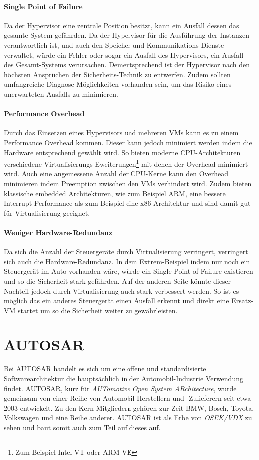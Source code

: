 \documentclass[
  a4paper,					    %
  twoside,
  DIV=calc,     				%
  bibliography=totoc,
  cleardoublepage=empty,
  ngerman,     					%
  final       					%
]{scrbook}
\begin{document}
\paragraph{Single Point of Failure}
Da der Hypervisor eine zentrale Position besitzt, kann ein Ausfall dessen das gesamte System gefährden. Da der Hypervisor für die Ausführung der Instanzen verantwortlich ist, und auch den Speicher und Kommunikations-Dienste verwaltet, würde ein Fehler oder sogar ein Ausfall des Hypervisors, ein Ausfall des Gesamt-Systems verursachen. Dementsprechend ist der Hypervisor nach den höchsten Ansprüchen der Sicherheits-Technik zu entwerfen. Zudem sollten umfangreiche Diagnose-Möglichkeiten vorhanden sein, um das Risiko eines unerwarteten Ausfalls zu minimieren.

\paragraph{Performance Overhead}
Durch das Einsetzen eines Hypervisors und mehreren VMs kann es zu einem Performance Overhead kommen. Dieser kann jedoch minimiert werden indem die Hardware entsprechend gewählt wird. So bieten moderne CPU-Architekturen verschiedene Virtualisierungs-Eweiterungen\footnote{Zum Beispiel Intel VT oder ARM VE} mit denen der Overhead minimiert wird. Auch eine angemessene Anzahl der CPU-Kerne kann den Overhead minimieren indem Preemption zwischen den VMs verhindert wird. Zudem bieten klassische embedded Architekturen, wie zum Beispiel ARM, eine bessere Interrupt-Performance als zum Beispiel eine x86 Architektur und sind damit gut für Virtualisierung geeignet.\cite{okl4}

\paragraph{Weniger Hardware-Redundanz}
Da sich die Anzahl der Steuergeräte durch Virtualisierung verringert, verringert sich auch die Hardware-Redundanz. In dem Extrem-Beispiel indem nur noch ein Steuergerät im Auto vorhanden wäre, würde ein Single-Point-of-Failure existieren und so die Sicherheit stark gefährden. Auf der anderen Seite könnte dieser Nachteil jedoch durch Virtualisierung auch stark verbessert werden. So ist es möglich das ein anderes Steuergerät einen Ausfall erkennt und direkt eine Ersatz-VM startet um so die Sicherheit weiter zu gewährleisten. 



\section{AUTOSAR}
\label{sec:Autosar}
Bei AUTOSAR handelt es sich um eine offene und standardisierte Softwarearchitektur die hauptsächlich in der Automobil-Industrie Verwendung findet. AUTOSAR, kurz für \emph{AUTomotive Open System ARchitecture}, wurde gemeinsam von einer Reihe von Automobil-Herstellern und -Zulieferern seit etwa 2003 entwickelt. Zu den Kern Mitgliedern gehören zur Zeit BMW, Bosch, Toyota, Volkswagen und eine Reihe anderer. AUTOSAR ist als Erbe von \emph{OSEK/VDX} zu sehen und baut somit auch zum Teil auf dieses auf.
\end{document}
